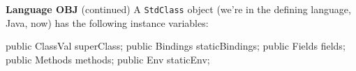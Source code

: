 \begin{minipage}[t]{\sw}
\slidenumber
\LARGE
{\bf Language OBJ} (continued)\exx
A \verb'StdClass' object (we're in the defining language, Java, now)
has the following instance variables:
\begin{qv}
    public ClassVal superClass;
    public Bindings staticBindings; 
    public Fields fields;
    public Methods methods;
    public Env staticEnv;
\end{qv}
\end{minipage}
